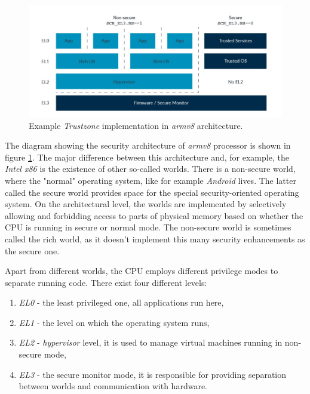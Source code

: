 \begin{figure}
    \centering
    \includegraphics[width=.9\linewidth]{tex/img/trustzone.jpg}
    \caption{Example \textit{Trustzone} implementation in \textit{armv8} architecture.}
    \label{fig:tzarmv8}
\end{figure}

The diagram showing the security architecture of \textit{armv8} processor is shown in figure \ref{fig:tzarmv8}. The major difference between this architecture and, for example, the \textit{Intel x86} is the existence of other so-called worlds. There is a non-secure world, where the "normal" operating system, like for example \textit{Android} lives. The latter called the secure world provides space for the special security-oriented operating system. On the architectural level, the worlds are implemented by selectively allowing and forbidding access to parts of physical memory based on whether the CPU is running in secure or normal mode. The non-secure world is sometimes called the rich world, as it doesn't implement this many security enhancements as the secure one.

Apart from different worlds, the CPU employs different privilege modes to separate running code. There exist four different levels:
\begin{enumerate}
    \item \textit{EL0} - the least privileged one, all applications run here,
    \item \textit{EL1} - the level on which the operating system runs,
    \item \textit{EL2} - \textit{hypervisor} level, it is used to manage virtual machines running in non-secure mode,
    \item \textit{EL3} - the secure monitor mode, it is responsible for providing separation between worlds and communication with hardware.
\end{enumerate}

